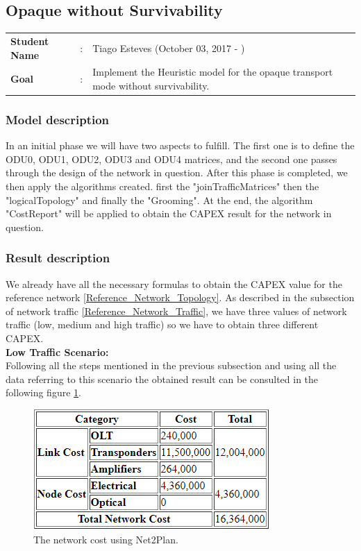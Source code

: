 \clearpage

\subsection{Opaque without Survivability}\label{heuristic_Opaque_Survivability}
\begin{tcolorbox}	
\begin{tabular}{p{2.75cm} p{0.2cm} p{10.5cm}} 	
\textbf{Student Name}  &:& Tiago Esteves    (October 03, 2017 - )\\
\textbf{Goal}          &:& Implement the Heuristic model for the opaque transport mode without survivability.
\end{tabular}
\end{tcolorbox}

\subsubsection{Model description}

In an initial phase we will have two aspects to fulfill. The first one is to define the ODU0, ODU1, ODU2, ODU3 and ODU4 matrices, and the second one passes through the design of the network in question.
After this phase is completed, we then apply the algorithms created. first the "joinTrafficMatrices" then the "logicalTopology" and finally the "Grooming".
At the end, the algorithm "CostReport" will be applied to obtain the CAPEX result for the network in question.


\subsubsection{Result description}

We already have all the necessary formulas to obtain the CAPEX value for the reference network \ref{Reference_Network_Topology}. As described in the subsection of network traffic \ref{Reference_Network_Traffic}, we have three values of network traffic (low, medium and high traffic) so we have to obtain three different CAPEX.\\

\textbf{Low Traffic Scenario:}\\

Following all the steps mentioned in the previous subsection and using all the data referring to this scenario the obtained result can be consulted in the following figure \ref{heuristicopaque_surv_ref_low}.

\begin{figure}[h!]
\centering
\includegraphics[width=9cm]{sdf/heuristic/figures/heuristic_opaque_surv_ref_low}
\caption{The network cost using Net2Plan.}
\label{heuristicopaque_surv_ref_low}
\end{figure}


